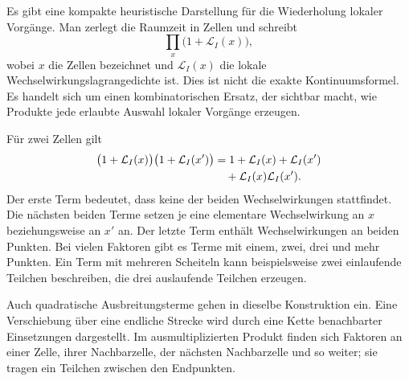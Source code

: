 Es gibt eine kompakte heuristische Darstellung für die Wiederholung lokaler Vorgänge. Man zerlegt die Raumzeit in Zellen und schreibt
\begin{equation}
\prod_x\bigl(1+\mathcal L_I(x)\bigr),
\end{equation}
wobei \(x\) die Zellen bezeichnet und \(\mathcal L_I(x)\) die lokale Wechselwirkungslagrangedichte ist. Dies ist nicht die exakte Kontinuumsformel. Es handelt sich um einen kombinatorischen Ersatz, der sichtbar macht, wie Produkte jede erlaubte Auswahl lokaler Vorgänge erzeugen.

\begin{classroomqa}
\end{classroomqa}

Für zwei Zellen gilt
\begin{align}
\bigl(1+\mathcal L_I(x)\bigr)
\bigl(1+\mathcal L_I(x')\bigr)
&=
1+\mathcal L_I(x)+\mathcal L_I(x')
\notag\\
&\quad{}+\mathcal L_I(x)\mathcal L_I(x').
\end{align}
Der erste Term bedeutet, dass keine der beiden Wechselwirkungen stattfindet. Die nächsten beiden Terme setzen je eine elementare Wechselwirkung an \(x\) beziehungsweise an \(x'\) an. Der letzte Term enthält Wechselwirkungen an beiden Punkten. Bei vielen Faktoren gibt es Terme mit einem, zwei, drei und mehr Punkten. Ein Term mit mehreren Scheiteln kann beispielsweise zwei einlaufende Teilchen beschreiben, die drei auslaufende Teilchen erzeugen.

Auch quadratische Ausbreitungsterme gehen in dieselbe Konstruktion ein. Eine Verschiebung über eine endliche Strecke wird durch eine Kette benachbarter Einsetzungen dargestellt. Im ausmultiplizierten Produkt finden sich Faktoren an einer Zelle, ihrer Nachbarzelle, der nächsten Nachbarzelle und so weiter; sie tragen ein Teilchen zwischen den Endpunkten.

\begin{classroomqa}
\end{classroomqa}

